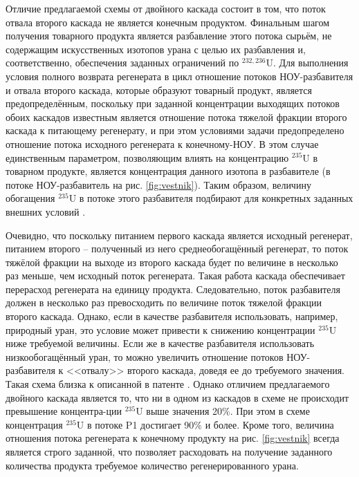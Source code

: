 Отличие предлагаемой схемы от двойного каскада состоит в том, что поток отвала второго каскада не является конечным продуктом.
Финальным шагом получения товарного продукта является разбавление этого потока сырьём, не содержащим искусственных изотопов урана с целью их разбавления и, соответственно, обеспечения заданных ограничений по $^{232,236}$U.
Для выполнения условия полного возврата регенерата в цикл отношение потоков НОУ-разбавителя и отвала второго каскада, которые образуют товарный продукт, является предопределённым, поскольку при заданной концентрации выходящих потоков обоих каскадов известным является отношение потока тяжелой фракции второго каскада к питающему регенерату, и при этом условиями задачи предопределено отношение потока исходного регенерата к конечному-НОУ.
В этом случае единственным параметром, позволяющим влиять на концентрацию $^{235}$U в товарном продукте, является концентрация данного изотопа в разбавителе (в потоке НОУ-разбавитель на рис. \ref{fig:vestnik}).
Таким образом, величину обогащения $^{235}$U в потоке этого разбавителя подбирают для конкретных заданных внешних условий \cite{smirnovObogashchenieRegenerirovannogoUrana2018}.

Очевидно, что поскольку питанием первого каскада является исходный регенерат, питанием второго -- полученный из него среднеобогащённый регенерат, то поток тяжёлой фракции на выходе из второго каскада будет по величине в несколько раз меньше, чем исходный поток регенерата. Такая работа каскада обеспечивает перерасход регенерата на единицу продукта. Следовательно, поток разбавителя должен в несколько раз превосходить по величине поток тяжелой фракции второго каскада. Однако, если в качестве разбавителя использовать, например, природный уран, это условие может привести к снижению концентрации $^{235}$U ниже требуемой величины. Если же в качестве разбавителя использовать низкообогащённый уран, то можно увеличить отношение потоков НОУ-разбавителя к <<отвалу>> второго каскада, доведя ее до требуемого значения.  
Такая схема близка к описанной в патенте \cite{zhurinSposobIzotopnogoVosstanovleniya2010}. Однако отличием предлагаемого двойного каскада является то, что ни в одном из каскадов в схеме не происходит превышение концентра-ции $^{235}$U выше значения 20\%. При этом в схеме  \cite{zhurinSposobIzotopnogoVosstanovleniya2010} концентрация $^{235}$U в потоке P1 достигает 90\% и более. Кроме того, величина отношения потока регенерата к конечному продукту на рис. \ref{fig:vestnik} всегда является строго заданной, что позволяет расходовать на получение заданного количества продукта требуемое количество регенерированного урана.

